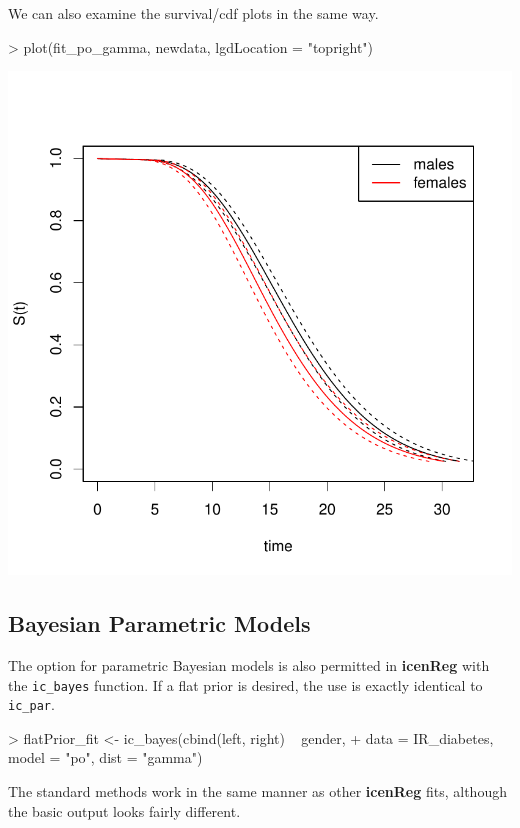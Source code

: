 \documentclass[a4paper]{article}
\begin{document}
  We can also examine the survival/cdf plots in the same way. 
  
\begin{Schunk}
\begin{Sinput}
> plot(fit_po_gamma, newdata, lgdLocation = "topright")
\end{Sinput}
\end{Schunk}
\includegraphics{icenReg-013}

  \subsection{Bayesian Parametric Models}
  
  The option for parametric Bayesian models is also permitted in {\bf icenReg} with the \texttt{ic\_bayes} function. If a flat prior is desired, the use is exactly identical to \texttt{ic\_par}. 
  
\begin{Schunk}
\begin{Sinput}
> flatPrior_fit <- ic_bayes(cbind(left, right) ~ gender,
+     data = IR_diabetes, model = "po", dist = "gamma")
\end{Sinput}
\end{Schunk}

The standard methods work in the same manner as other {\bf icenReg} fits, although the basic output looks fairly different.
\end{document}
